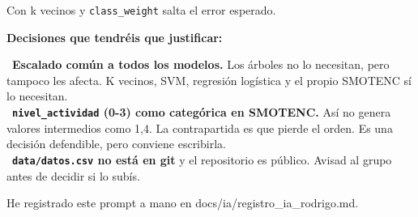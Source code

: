 \documentclass[11pt,a4paper]{article}
\begin{document}
{Con k vecinos y \texttt{class\_\allowbreak{}weight} salta el error esperado.

\textbf{Decisiones que tendréis que justificar:}

\hspace*{1.0em}\textbullet~\textbf{Escalado común a todos los modelos.} Los árboles no lo necesitan, pero tampoco les afecta. K vecinos, SVM, regresión logística y el propio SMOTENC sí lo necesitan. \\{}
\hspace*{1.0em}\textbullet~\textbf{\texttt{nivel\_\allowbreak{}actividad} (0-3) como categórica en SMOTENC.} Así no genera valores intermedios como 1,4. La contrapartida es que pierde el orden. Es una decisión defendible, pero conviene escribirla. \\{}
\hspace*{1.0em}\textbullet~\textbf{\texttt{data/\allowbreak{}datos.csv} no está en git} y el repositorio es público. Avisad al grupo antes de decidir si lo subís.

He registrado este prompt a mano en docs/\allowbreak{}ia/\allowbreak{}registro\_\allowbreak{}ia\_\allowbreak{}rodrigo.md.

}
\end{document}
